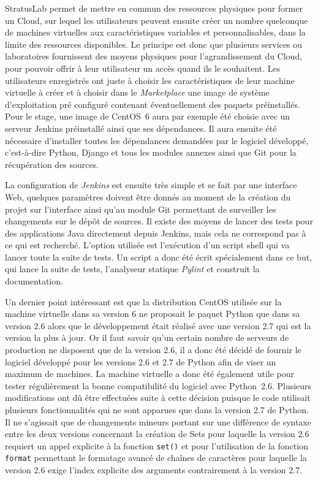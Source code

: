 \documentclass[12pt,a4paper,twoside]{report}
\begin{document}
StratusLab permet de mettre en commun des ressources physiques pour former un
Cloud, sur lequel les utilisateurs peuvent ensuite créer un nombre quelconque
de machines virtuelles aux caractéristiques variables et personnalisables, dans
la limite des ressources disponibles. Le principe est donc que plusieurs
services ou laboratoires fournissent des moyens physiques pour l’agrandissement
du Cloud, pour pouvoir offrir à leur utilisateur un accès quand ils le
souhaitent. Les utilisateurs enregistrés ont juste à choisir les
caractéristiques de leur machine virtuelle à créer et à choisir dans le
\emph{Marketplace} une image de système d’exploitation pré configuré contenant
éventuellement des paquets préinstallés. Pour le stage, une image de CentOS~6
aura par exemple été choisie avec un serveur Jenkins préinstallé ainsi que ses
dépendances. Il aura ensuite été nécessaire d’installer toutes les dépendances
demandées par le logiciel développé, c'est-à-dire Python, Django et tous les
modules annexes ainsi que Git pour la récupération des sources.

La configuration de \emph{Jenkins} est ensuite très simple et se fait par une
interface Web, quelques paramètres doivent être donnés au moment de la création
du projet sur l’interface ainsi qu’au module Git permettant de surveiller les
changements sur le dépôt de sources. Il existe des moyens de lancer des tests
pour des applications Java directement depuis Jenkins, mais cela ne correspond
pas à ce qui est recherché. L’option utilisée est l’exécution d’un script shell
qui va lancer toute la suite de tests. Un script a donc été écrit spécialement
dans ce but, qui lance la suite de tests, l’analyseur statique \emph{Pylint} et
construit la documentation.

Un dernier point intéressant est que la distribution CentOS utilisée sur la
machine virtuelle dans sa version 6 ne proposait le paquet Python que dans sa
version 2.6 alors que le développement était réalisé avec une version 2.7 qui
est la version la plus à jour. Or il faut savoir qu’un certain nombre de
serveurs de production ne disposent que de la version 2.6, il a donc été décidé
de fournir le logiciel développé pour les versions 2.6 et 2.7 de Python afin de
viser un maximum de machines. La machine virtuelle a donc été également utile
pour tester régulièrement la bonne compatibilité du logiciel avec Python~2.6.
Plusieurs modifications ont dû être effectuées suite à cette décision puisque
le code utilisait plusieurs fonctionnalités qui ne sont apparues que dans la
version 2.7 de Python. Il ne s’agissait que de changements mineurs portant
sur une différence de syntaxe entre les deux versions concernant la création de
Sets pour laquelle la version 2.6 requiert un appel explicite à la fonction
\verb+set()+ et pour l’utilisation de la fonction \verb+format+ permettant le
formatage avancé de chaînes de caractères pour laquelle la version 2.6 exige
l’index explicite des arguments contrairement à la version 2.7.\\
\end{document}
